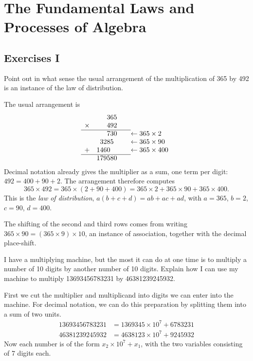 \documentclass[DIN, pagenumber=false, fontsize=11pt, parskip=half]{scrartcl}
\title{}
\author{} %
\date{}
\begin{document}
\maketitle

\section{The Fundamental Laws and Processes of Algebra}

\subsection{Exercises I}

\begin{problems}[from=1,step=1]
    \problem Point out in what sense the usual arrangement of the multiplication of 365 by 492 is an instance of the law of distribution.

    \answer The usual arrangement is
    \[
        \begin{array}{r@{\quad}r@{\qquad}l}
                   &  365 \\
            \times &  492 \\ \cline{1-2}
                   &  730              & \leftarrow 365 \times 2 \\
                   &  3285\phantom{0}  & \leftarrow 365 \times 90 \\
                 +  &  1460\phantom{00} & \leftarrow 365 \times 400 \\ \cline{1-2}
                   &  179580
        \end{array}
    \]
    Decimal notation already gives the multiplier as a sum, one term per digit: $492 = 400 + 90 + 2$. The arrangement therefore computes
    \[
        365 \times 492 = 365 \times (2 + 90 + 400) = 365 \times 2 + 365 \times 90 + 365 \times 400.
    \]
    This is the \emph{law of distribution}, $a(b + c + d) = ab + ac + ad$, with $a = 365$, $b = 2$, $c = 90$, $d = 400$. 

    The shifting of the second and third rows comes from writing $365 \times 90 = (365 \times 9) \times 10$, an instance of association, together with the decimal place-shift. 
    

    \problem I have a multiplying machine, but the most it can do at one time is to multiply a number of 10 digits by another number of 10 digits. Explain how I can use my machine to multiply 13693456783231 by 46381239245932.

    \answer First we cut the multiplier and multiplicand into digits we can enter into the machine. For decimal notation, we can do this preparation by splitting them into a sum of two units.
    \begin{align*}
        13693456783231 & = 1369345 \times 10^{7} + 6783231\\ 
        46381239245932 & = 4638123 \times 10^{7} + 9245932
    \end{align*}
    Now each number is of the form $x_2 \times 10^{7} + x_1$, with the two variables consisting of 7 digits each. 


\end{problems}
\end{document}
